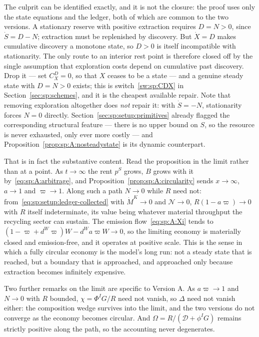 The culprit can be identified exactly, and it is not the closure: the proof uses only the state
equations and the ledger, both of which are common to the two versions. A stationary reserve with
positive extraction requires $D=N>0$, since $\dot S=D-N$; extraction must be replenished by discovery.
But $\dot X=D$ makes cumulative discovery a monotone state, so $D>0$ is itself incompatible with
stationarity. The only route to an interior rest point is therefore closed off by the single
assumption that exploration costs depend on cumulative past discovery. Drop it --- set $C^D_X=0$, so
that $X$ ceases to be a state --- and a genuine steady state with $D=N>0$ exists; this is
switch~\ref{sw:sp:CDX} in Section~\ref{sec:sp:schemes}, and it is the cheapest available repair. Note
that removing exploration altogether does \emph{not} repair it: with $\dot S=-N$, stationarity forces
$N=0$ directly. Section~\ref{sec:sp:setup:primitives} already flagged the corresponding structural
feature --- there is no upper bound on $S$, so the resource is never exhausted, only ever more costly
--- and Proposition~\ref{prop:sp:A:nosteadystate} is its dynamic counterpart.

That is in fact the substantive content. Read the proposition in the limit rather than at a point. As
$t\to\infty$ the rent $p^S$ grows, $B$ grows with it by~\eqref{eq:sp:A:arbitrage}, and
Proposition~\ref{prop:sp:A:circularity} sends $x\to\infty$, $a\to1$ and $\varpi\to1$. Along such a path
$N\to0$ while $R$ need not: from~\eqref{eq:sp:setup:ledger-collected} with $\dot M^K\to0$ and
$\mathcal N\to0$, $R\left(1-a\varpi\right)\to0$ with $R$ itself indeterminate, its value being whatever
material throughput the recycling sector can sustain. The emission flow~\eqref{eq:sp:A:Xi} tends to
$\left(1-\varpi+d^W\varpi\right)W-d^Wa\varpi W\to0$, so the limiting economy is materially closed and
emission-free, and it operates at positive scale. This is the sense in which a fully circular economy
is the model's long run: not a steady state that is reached, but a boundary that is approached, and
approached only because extraction becomes infinitely expensive.

Two further remarks on the limit are specific to Version A. As $a\varpi\to1$ and $N\to0$ with $R$
bounded, $\chi=\Phi^IG/R$ need not vanish, so $\Delta$ need not vanish either: the composition wedge
survives into the limit, and the two versions do not converge as the economy becomes circular. And
$\Omega=R/\left(\mathcal D+\phi^IG\right)$ remains strictly positive along the path, so the accounting
never degenerates.


